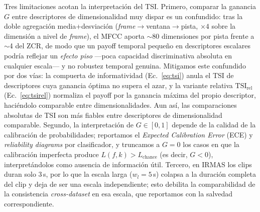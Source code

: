 \documentclass[conference]{IEEEtran}
\begin{document}
Tres limitaciones acotan la interpretación del TSI. Primero, comparar la ganancia $G$ entre descriptores de dimensionalidad muy dispar es un confundido: tras la doble agregación media+desviación (\textit{frame}$\to$ventana$\to$pista, $\times 4$ sobre la dimensión a nivel de \textit{frame}), el MFCC aporta $\sim$80 dimensiones por pista frente a $\sim$4 del ZCR, de modo que un payoff temporal pequeño en descriptores escalares podría reflejar un \emph{efecto piso} ---poca capacidad discriminativa absoluta en cualquier escala--- y no robustez temporal genuina. Mitigamos este confundido por dos vías: la compuerta de informatividad (Ec.~\ref{eq:tsi}) anula el TSI de descriptores cuya ganancia óptima no supera el azar, y la variante relativa $\mathrm{TSI}_{\mathrm{rel}}$ (Ec.~\ref{eq:tsirel}) normaliza el payoff por la ganancia máxima del propio descriptor, haciéndolo comparable entre dimensionalidades. Aun así, las comparaciones absolutas de TSI son más fiables entre descriptores de dimensionalidad comparable. Segundo, la interpretación de $G \in [0,1]$ depende de la calidad de la calibración de probabilidades; reportamos el \textit{Expected Calibration Error} (ECE) y \textit{reliability diagrams} por clasificador, y truncamos a $G = 0$ los casos en que la calibración imperfecta produce $L(f,k) > L_{\text{chance}}$ (es decir, $G < 0$), interpretándolos como ausencia de información útil. Tercero, en IRMAS los clips duran solo 3\,s, por lo que la escala larga ($w_l = 5$\,s) colapsa a la duración completa del clip y deja de ser una escala independiente; esto debilita la comparabilidad de la consistencia \textit{cross-dataset} en esa escala, que reportamos con la salvedad correspondiente.



\end{document}
